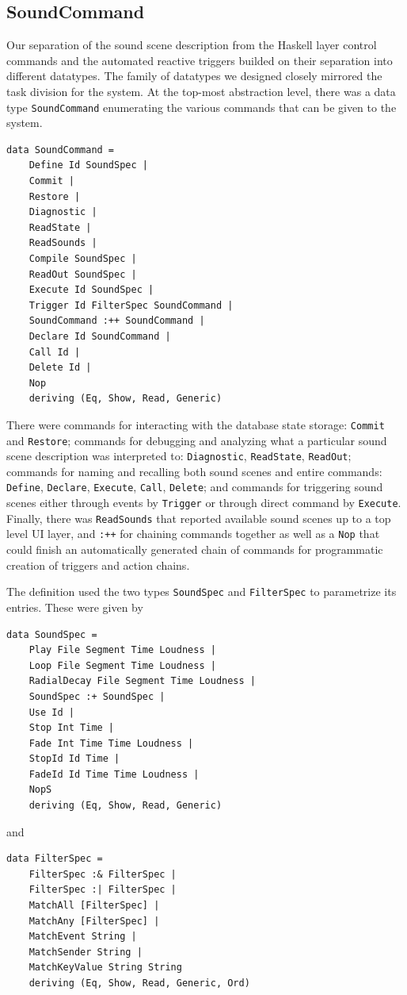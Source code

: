 \subsection{SoundCommand}
\label{sec:soundspec}

Our separation of the sound scene description from the Haskell layer
control commands and the automated reactive triggers builded on their
separation into different datatypes. 
The family of datatypes we designed closely mirrored the task division
for the system. 
At the top-most abstraction
level, there was a data type \texttt{SoundCommand} enumerating the
various commands that can be given to the system. 

\begin{verbatim}
data SoundCommand = 
    Define Id SoundSpec |
    Commit | 
    Restore | 
    Diagnostic |
    ReadState |
    ReadSounds | 
    Compile SoundSpec |
    ReadOut SoundSpec | 
    Execute Id SoundSpec |
    Trigger Id FilterSpec SoundCommand |
    SoundCommand :++ SoundCommand |
    Declare Id SoundCommand |
    Call Id | 
    Delete Id | 
    Nop
    deriving (Eq, Show, Read, Generic)
\end{verbatim}

There were commands for interacting with the database state storage:
\texttt{Commit} and \texttt{Restore}; commands for debugging and
analyzing what a particular sound scene description was interpreted to:
\texttt{Diagnostic}, \texttt{ReadState}, \texttt{ReadOut}; commands
for naming and recalling both sound scenes and entire commands:
\texttt{Define}, \texttt{Declare}, \texttt{Execute}, \texttt{Call},
\texttt{Delete}; and commands for triggering sound scenes either
through events by \texttt{Trigger} or through direct command by
\texttt{Execute}. Finally, there was \texttt{ReadSounds} that reported
available sound scenes up to a top level UI layer, and
\texttt{:++} for chaining commands together as well as a \texttt{Nop}
that could finish an automatically generated chain of commands for
programmatic creation of triggers and action chains. 

The definition used the two types \texttt{SoundSpec} and
\texttt{FilterSpec} to parametrize its entries. These were given by

\begin{verbatim}
data SoundSpec = 
    Play File Segment Time Loudness |
    Loop File Segment Time Loudness |
    RadialDecay File Segment Time Loudness | 
    SoundSpec :+ SoundSpec | 
    Use Id |
    Stop Int Time |
    Fade Int Time Time Loudness |
    StopId Id Time |
    FadeId Id Time Time Loudness |
    NopS
    deriving (Eq, Show, Read, Generic)
\end{verbatim}
and
\begin{verbatim}
data FilterSpec = 
    FilterSpec :& FilterSpec |
    FilterSpec :| FilterSpec |
    MatchAll [FilterSpec] |
    MatchAny [FilterSpec] |
    MatchEvent String |
    MatchSender String |
    MatchKeyValue String String
    deriving (Eq, Show, Read, Generic, Ord)
\end{verbatim}

